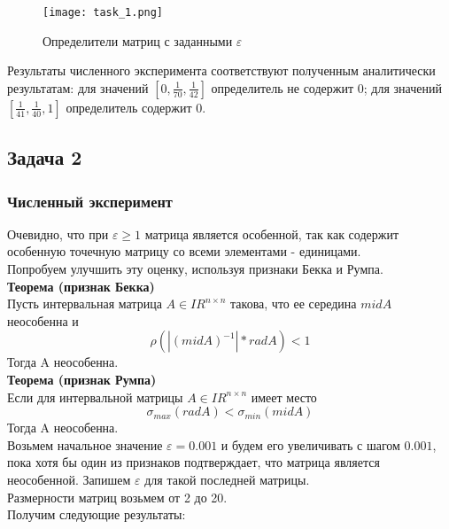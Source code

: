 \newpage

\begin{figure}[h]
	\centering
	\texttt{[image: task\_1.png]}
	\caption{Определители матриц с заданными $\varepsilon$}
\end{figure}

Результаты численного эксперимента соответствуют полученным аналитически результатам: для значений $[0, \frac{1}{70}, \frac{1}{42}]$ определитель не содержит 0; для значений $[\frac{1}{41}, \frac{1}{40}, 1]$ определитель содержит 0.


\subsection{Задача 2}

\subsubsection{Численный эксперимент}

Очевидно, что при $\varepsilon \geq 1$ матрица является особенной, так как содержит особенную точечную матрицу со всеми элементами - единицами. \\
Попробуем улучшить эту оценку, используя признаки Бекка и Румпа. \\

\textbf{Теорема (признак Бекка)} \\
Пусть интервальная матрица $A \in IR^{n \times n}$ такова, что ее середина $mid A$ неособенна и
\begin{equation}
	\rho(|(mid A)^{-1}| * rad A) < 1
\end{equation}
Тогда A неособенна. \\

\textbf{Теорема (признак Румпа)} \\
Если для интервальной матрицы $A \in IR^{n \times n}$ имеет место
\begin{equation}
	\sigma_{max}(rad A) < \sigma_{min}(mid A)
\end{equation}
Тогда A неособенна. \\

Возьмем начальное значение $\varepsilon = 0.001$ и будем его увеличивать с шагом $0.001$, пока хотя бы один из признаков подтверждает, что матрица является неособенной. Запишем $\varepsilon$ для такой последней матрицы.\\
Размерности матриц возьмем от 2 до 20. \\
Получим следующие результаты:

